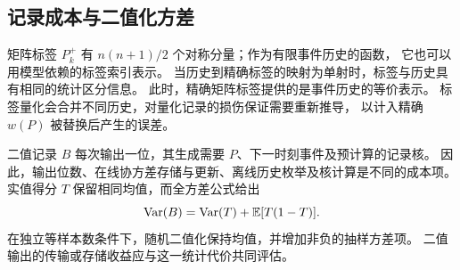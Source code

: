 \subsection{记录成本与二值化方差}
矩阵标签 $P_k^+$ 有 $n(n+1)/2$ 个对称分量；作为有限事件历史的函数，
它也可以用模型依赖的标签索引表示。
当历史到精确标签的映射为单射时，标签与历史具有相同的统计区分信息。
此时，精确矩阵标签提供的是事件历史的等价表示。
标签量化会合并不同历史，对量化记录的损伤保证需要重新推导，
以计入精确 $w(P)$ 被替换后产生的误差。

二值记录 $B$ 每次输出一位，其生成需要 $P$、下一时刻事件及预计算的记录核。
因此，输出位数、在线协方差存储与更新、离线历史枚举及核计算是不同的成本项。
实值得分 $T$ 保留相同均值，而全方差公式给出
\begin{equation}
 \operatorname{Var}(B)=\operatorname{Var}(T)+\mathbb E[T(1-T)].
 \label{eq:variance}
\end{equation}
在独立等样本数条件下，随机二值化保持均值，并增加非负的抽样方差项。
二值输出的传输或存储收益应与这一统计代价共同评估。



